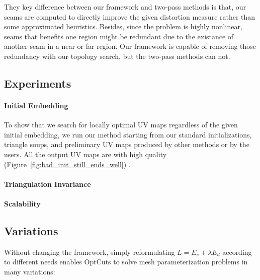 They key difference between our framework and two-pass methods is that, our seams are computed to directly improve the given distortion measure rather than some approximated heuristics. Besides, since the problem is highly nonlinear, seams that benefits one region might be redundant due to the existance of another seam in a near or far region. Our framework is capable of removing those redundancy with our topology search, but the two-pass methods can not.


\subsection{Experiments}
\label{sec:results_exp}

\paragraph{Initial Embedding}
To show that we search for locally optimal UV maps regardless of the given initial embedding, we run our method starting from our standard initializations, triangle soups, and preliminary UV maps produced by other methods or by the users. All the output UV maps are with high quality (Figure~\ref{fig:bad_init_still_ends_well}) \minchen{[TODO]}.

\paragraph{Triangulation Invariance} 

\paragraph{Scalability} \minchen{[TODO]}

\subsection{Variations}
\label{sec:results_variations}

Without changing the framework, simply reformulating $L = E_s + \lambda E_d$ according to different needs enables OptCuts to solve mesh parameterization problems in many variations:

